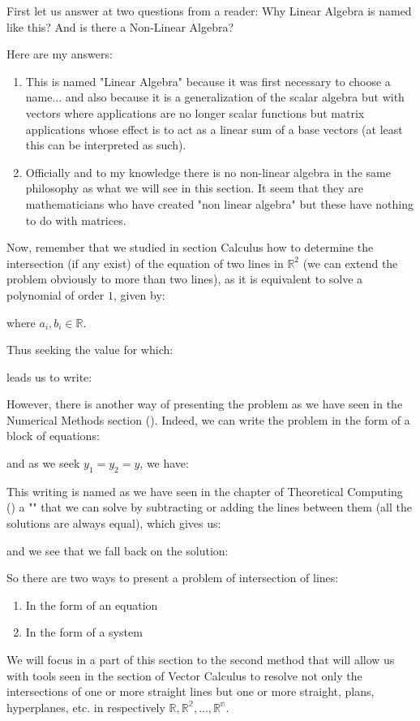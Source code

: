 	First let us answer at  two questions from a reader: Why Linear Algebra is named like this? And is there a Non-Linear Algebra?
	
	Here are my answers:

	\begin{enumerate}
		\item This is named "Linear Algebra" because it was first necessary to choose a name... and also because it is a generalization of the scalar algebra but with vectors where applications are no longer scalar functions but matrix applications whose effect is to act as a linear sum of a base vectors (at least this can be interpreted as such).
		\item Officially and to my knowledge there is no non-linear algebra in the same philosophy as what we will see in this section. It seem that they are mathematicians who have created "non linear algebra" but these have nothing to do with matrices.
	\end{enumerate}

Now, remember that we studied in section Calculus how to determine the intersection (if any exist) of the equation of two lines in $\mathbb{R}^2$  (we can extend the problem obviously to more than two lines), as it is equivalent to solve a polynomial of order $1$, given by:
	
where $a_i,b_i \in \mathbb{R}$.

Thus seeking the value for which:
	
leads us to write:
	
However, there is another way of presenting the problem as we have seen in the Numerical Methods section (). Indeed, we can write the problem in the form of a block of equations:
		
and as we seek $y_1=y_2=y$, we have:
		
This writing is named as we have seen in the chapter of Theoretical Computing () a "" that we can solve by subtracting or adding the lines between them (all the solutions are always equal), which gives us:
	
and we see that we fall back on the solution:
	
So there are two ways to present a problem of intersection of lines:
	\begin{enumerate}
		\item In the form of an equation
		\item In the form of a system
	\end{enumerate}
We will focus in a part of this section to the second method that will allow us with tools seen in the section of Vector Calculus to resolve not only the intersections of one or more straight lines but one or more straight, plans, hyperplanes, etc. in respectively $\mathbb{R},\mathbb{R^2},...,\mathbb{R^n}$. 

